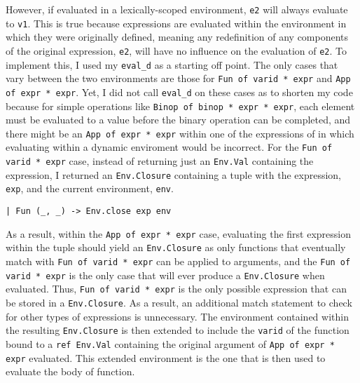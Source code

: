 \documentclass{report}
\begin{document}
However, if evaluated in a lexically-scoped environment,  \texttt{e2} will always evaluate to \texttt{v1}. This is true because expressions are evaluated within the environment in which they were originally defined, meaning any redefinition of any components of the original expression, \texttt{e2}, will have no influence on the evaluation of \texttt{e2}. To implement this, I used my \texttt{eval_d} as a starting off point. The only cases that vary between the two environments are those for \texttt{Fun of varid * expr} and \texttt{App of expr * expr}. Yet, I did not call \texttt{eval_d} on these cases as to shorten my code because for simple operations like \texttt{Binop of binop * expr * expr}, each element must be evaluated to a value before the binary operation can be completed, and there might be an \texttt{App of expr * expr} within one of the expressions of in which evaluating within a dynamic enviroment would be incorrect.
\newline \newline 
For the \texttt{Fun of varid * expr} case, instead of returning just an \texttt{Env.Val} containing the expression, I returned an \texttt{Env.Closure} containing a tuple with the expression, \texttt{exp}, and the current environment, \texttt{env}.
\begin{verbatim}
| Fun (_, _) -> Env.close exp env
\end{verbatim}
\newline \newline
As a result, within the \texttt{App of expr * expr} case, evaluating the first expression within the tuple should yield an \texttt{Env.Closure} as only functions that eventually match with \texttt{Fun of varid * expr} can be applied to arguments, and the \texttt{Fun of varid * expr} is the only case that will ever produce a \texttt{Env.Closure} when evaluated. Thus, \texttt{Fun of varid * expr} is the only possible expression that can be stored in a \texttt{Env.Closure}. As a result, an additional match statement to check for other types of expressions is unnecessary. The environment contained within the resulting \texttt{Env.Closure} is then extended to include the \texttt{varid} of the function bound to a \texttt{ref Env.Val} containing the original argument of \texttt{App of expr * expr} evaluated. This extended environment is the one that is then used to evaluate the body of function.\citep{closures}
\end{document}
